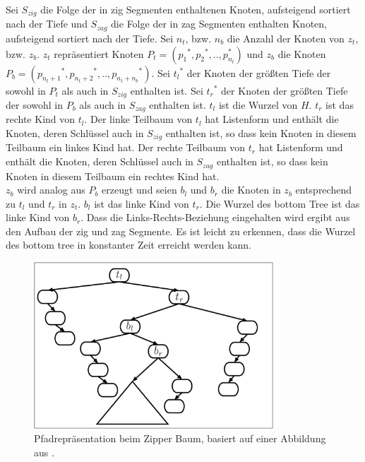 \documentclass[a4paper,12pt]{article}
\begin{document}
Sei $S_{zig}$ die Folge der in zig Segmenten enthaltenen Knoten, aufsteigend sortiert nach der Tiefe und $S_{zag}$ die Folge der in zag Segmenten enthalten Knoten, aufsteigend sortiert nach der Tiefe.  Sei $n_t$, bzw. $n_b$ die Anzahl der Knoten von $z_t$, bzw. $z_b$. $z_t$ repräsentiert Knoten  $P_t = \left({p_1}^*,{p_2}^*,..,p_{n_t}^*\right)$ und $z_b$ die Knoten  $P_b = \left({p_{n_t + 1}}^*,{p_{n_t + 2}}^*,..,{p_{n_t + n_b}}^*\right)$.
Sei ${t_l}^*$ der Knoten der größten Tiefe der sowohl in $P_t$ als auch in $S_{zig}$ enthalten ist. Sei ${t_r}^*$ der Knoten der größten Tiefe der sowohl in $P_b$ als auch in $S_{zag}$ enthalten ist. $t_l$ ist die Wurzel von $H$. $t_r$ ist das rechte Kind von $t_l$. Der linke Teilbaum von $t_l$  hat Listenform und  enthält die  Knoten, deren Schlüssel auch in  $S_{zig}$ enthalten ist, so dass kein Knoten in diesem Teilbaum ein linkes Kind hat. Der rechte Teilbaum von $t_r$  hat Listenform und  enthält die  Knoten, deren Schlüssel auch in $S_{zag}$ enthalten ist, so dass kein Knoten in diesem Teilbaum ein rechtes Kind hat. \\
$z_b$ wird analog aus $P_b$ erzeugt und seien $b_l$ und $b_r$ die Knoten in $z_b$ entsprechend zu $t_l$ und $t_r$ in $z_t$. $b_l$ ist das linke Kind von $t_r$. Die Wurzel des bottom Tree ist das linke Kind von $b_r$. Dass die Links-Rechts-Beziehung eingehalten wird ergibt aus den Aufbau der zig und zag Segmente. Es ist leicht zu erkennen, dass die Wurzel des bottom tree in konstanter Zeit erreicht werden kann.
\begin{figure}[H]
	\includegraphics[width= 0.8\textwidth]{Medien/Zipper/zipperPathRep}
	\caption{Pfadrepräsentation beim Zipper Baum, basiert auf einer Abbildung aus \cite{zipper}. }
	\label{fig:zipperPathRep}
\end{figure}
\end{document}
